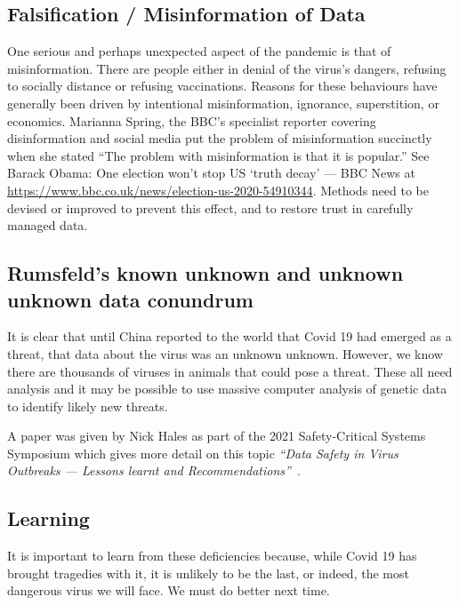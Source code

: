 \subsection{Falsification / Misinformation of Data}
One serious and perhaps unexpected aspect of the pandemic is that of misinformation. There are people either in denial of the virus’s dangers, refusing to socially distance or refusing vaccinations. Reasons for these behaviours have generally been driven by intentional misinformation, ignorance, superstition, or economics. Marianna Spring, the BBC’s specialist reporter covering disinformation and social media put the problem of misinformation succinctly when she stated “The problem with misinformation is that it is popular.” See Barack Obama: One election won't stop US `truth decay' --- BBC News at \href{https://www.bbc.co.uk/news/election-us-2020-54910344}{https://www.bbc.co.uk/news/election-us-2020-54910344}. Methods need to be devised or improved to prevent this effect, and to restore trust in carefully managed data. 

\subsection{Rumsfeld’s known unknown and unknown unknown data conundrum}

It is clear that until China reported to the world that Covid 19 had emerged as a threat, that data about the virus was an unknown unknown. However, we know there are thousands of viruses in animals that could pose a threat. These all need analysis and it may be possible to use massive computer analysis of genetic data to identify likely new threats. 
	
A paper was
given by Nick Hales as part of the 2021 Safety-Critical Systems Symposium which gives more detail on this topic {\it“Data Safety in Virus Outbreaks --- Lessons learnt and Recommendations”}~\cite{citation:SCSC161}.

\subsection{Learning}

It is important to learn from these deficiencies because, while Covid 19 has brought tragedies with it, it is unlikely to be the last, or indeed, the most dangerous virus we will face. We must do better next time.
